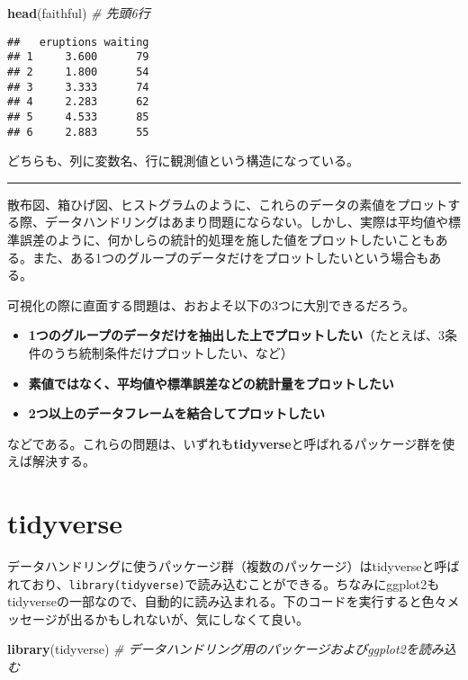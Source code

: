 \documentclass[]{book}
\newenvironment{Shaded}{\begin{snugshade}}{\end{snugshade}}
\newcommand{\KeywordTok}[1]{\textcolor[rgb]{0.13,0.29,0.53}{\textbf{#1}}}
\newcommand{\CommentTok}[1]{\textcolor[rgb]{0.56,0.35,0.01}{\textit{#1}}}
\newcommand{\NormalTok}[1]{#1}
\begin{document}
\begin{Shaded}
\begin{Highlighting}[]
\KeywordTok{head}\NormalTok{(faithful) }\CommentTok{# 先頭6行}
\end{Highlighting}
\end{Shaded}

\begin{verbatim}
##   eruptions waiting
## 1     3.600      79
## 2     1.800      54
## 3     3.333      74
## 4     2.283      62
## 5     4.533      85
## 6     2.883      55
\end{verbatim}

どちらも、列に変数名、行に観測値という構造になっている。

\begin{center}\rule{0.5\linewidth}{\linethickness}\end{center}

散布図、箱ひげ図、ヒストグラムのように、これらのデータの素値をプロットする際、データハンドリングはあまり問題にならない。しかし、実際は平均値や標準誤差のように、何かしらの統計的処理を施した値をプロットしたいこともある。また、ある1つのグループのデータだけをプロットしたいという場合もある。

可視化の際に直面する問題は、おおよそ以下の3つに大別できるだろう。

\begin{itemize}
\item
  \textbf{1つのグループのデータだけを抽出した上でプロットしたい}（たとえば、3条件のうち統制条件だけプロットしたい、など）
\item
  \textbf{素値ではなく、平均値や標準誤差などの統計量をプロットしたい}
\item
  \textbf{2つ以上のデータフレームを結合してプロットしたい}
\end{itemize}

などである。これらの問題は、いずれも\textbf{tidyverse}と呼ばれるパッケージ群を使えば解決する。

\section{tidyverse}\label{tidyverse}

データハンドリングに使うパッケージ群（複数のパッケージ）はtidyverseと呼ばれており、\texttt{library(tidyverse)}で読み込むことができる。ちなみにggplot2もtidyverseの一部なので、自動的に読み込まれる。下のコードを実行すると色々メッセージが出るかもしれないが、気にしなくて良い。

\begin{Shaded}
\begin{Highlighting}[]
\KeywordTok{library}\NormalTok{(tidyverse) }\CommentTok{# データハンドリング用のパッケージおよびggplot2を読み込む}
\end{Highlighting}
\end{Shaded}
\end{document}
